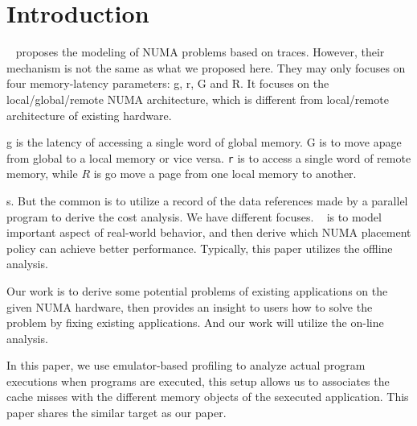\section{Introduction}

~\cite{Bolosky:1991:NPR:106972.106994} proposes the modeling of NUMA problems based on traces. However, their mechanism is not the same as what we proposed here. They may only focuses on four memory-latency parameters: g, r, G and R. It focuses on the local/global/remote NUMA architecture, which is different from local/remote architecture of existing hardware. 

g is the latency of accessing a single word of  global memory. G is to move apage from global to a local memory or vice versa. \texttt{r} is to access a single word of remote memory, while  $R$ is go move a page from one local memory to another. 

s. 
But the common is to utilize a record of the data references made by a parallel program to derive the cost analysis. 
We have different focuses. ~\cite{Bolosky:1991:NPR:106972.106994} is to model important aspect of real-world behavior, and then derive which NUMA placement policy can achieve better performance. Typically, this paper utilizes the offline analysis.   

Our work is to derive some potential problems of existing applications on the given NUMA hardware, then provides an insight to users how to solve the problem by fixing existing applications. And our work will utilize the on-line analysis. 

In this paper, we use emulator-based profiling to analyze actual program executions when programs are executed, this setup allows us to associates the cache misses with the different memory objects of the sexecuted application. 
This paper shares the similar target as our paper. 


